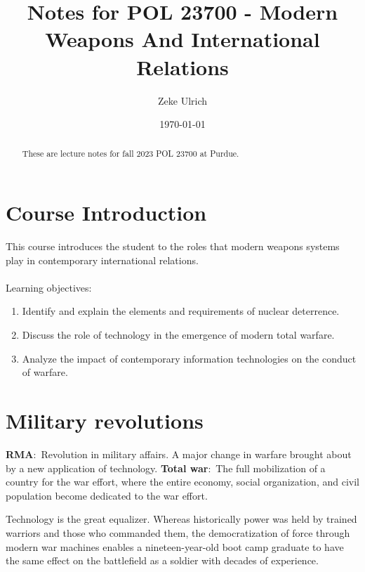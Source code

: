 \documentclass[nobib]{tufte-handout}
\title{Notes for POL 23700 - Modern Weapons And International Relations}
\author[Zeke Ulrich]{Zeke Ulrich}
\date{\today}  %
\newcommand{\defn}[2]{\noindent\textbf{#1}:\ #2}
\begin{document}
\maketitle

\begin{abstract}
These are lecture notes for fall 2023 POL 23700 at Purdue.
\end{abstract}

\tableofcontents

\section{Course Introduction}
This course introduces the student to the roles that modern weapons systems 
play in contemporary international relations.
\\~\\
Learning objectives: 
\begin{enumerate}
    \item Identify and explain the elements and requirements of nuclear deterrence.
    \item Discuss the role of technology in the emergence of modern total warfare.
    \item Analyze the impact of contemporary information technologies on the conduct of warfare.
\end{enumerate}

\pagebreak 

\section{Military revolutions}
\defn{RMA}{Revolution in military affairs. A major change in warfare brought about by a new application of technology.}
\defn{Total war}{The full mobilization of a country for the war effort, where 
the entire economy, social organization, and civil population become dedicated 
to the war effort.}

Technology is the great equalizer. Whereas historically
power was held by trained warriors and those who 
commanded them, the democratization of force through 
modern war machines enables a nineteen-year-old boot camp 
graduate to have the same effect on the battlefield
as a soldier with decades of experience. 
\end{document}
